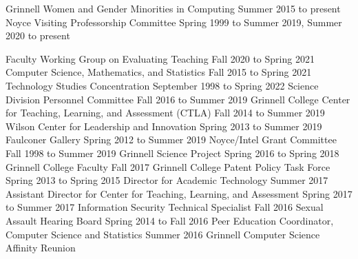 \begin{cventries}


  {Grinnell Women and Gender Minorities in Computing}
  {Summer 2015 to present}
  {Noyce Visiting Professorship Committee}
  {Spring 1999 to Summer 2019, Summer 2020 to present}

\vspace{1mm}


  {Faculty Working Group on Evaluating Teaching}
  {Fall 2020 to Spring 2021}
  {Computer Science, Mathematics, and Statistics}
  {Fall 2015 to Spring 2021}
  {Technology Studies Concentration}
  {September 1998 to Spring 2022}
  {Science Division Personnel Committee}
  {Fall 2016 to Summer 2019}
  {Grinnell College Center for Teaching, Learning, and Assessment (CTLA)}
  {Fall 2014 to Summer 2019}
  {Wilson Center for Leadership and Innovation}
  {Spring 2013 to Summer 2019}
  {Faulconer Gallery}
  {Spring 2012 to Summer 2019}
  {Noyce/Intel Grant Committee}
  {Fall 1998 to Summer 2019}
  {Grinnell Science Project}
  {Spring 2016 to Spring 2018}
  {Grinnell College Faculty}
  {Fall 2017}
  {Grinnell College Patent Policy Task Force}
  {Spring 2013 to Spring 2015}
  {Director for Academic Technology}
  {Summer 2017}
  {Assistant Director for Center for Teaching, Learning, and Assessment}
  {Spring 2017 to Summer 2017}
  {Information Security Technical Specialist}
  {Fall 2016}
  {Sexual Assault Hearing Board}
  {Spring 2014 to Fall 2016}
  {Peer Education Coordinator, Computer Science and Statistics}
  {Summer 2016}
  {Grinnell Computer Science Affinity Reunion}

\end{cventries}
